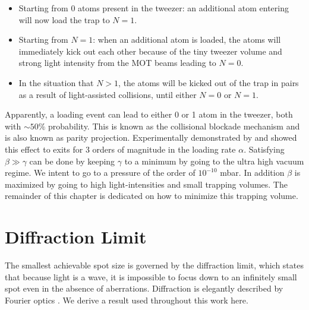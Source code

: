 \begin{itemize}
	\item Starting from 0 atoms present in the tweezer: an additional atom entering will now load the trap to $N=1$. 
	
	\item Starting from $N=1$: when an additional atom is loaded, the atoms will immediately kick out each other because of the tiny tweezer volume and strong light intensity from the MOT beams leading to $N=0$.
	
	\item In the situation that $N>1$, the atoms will be kicked out of the trap in pairs as a result of light-assisted collisions, until either $N=0$ or $N=1$.
\end{itemize}
Apparently, a loading event can lead to either 0 or 1 atom in the tweezer, both with $\sim 50\%$ probability. 
This is known as the collisional blockade mechanism and is also known as parity projection.
Experimentally demonstrated by \cite{Schlosser2001} and \cite{Schlosser2002} showed this effect to exits for 3 orders of magnitude in the loading rate $\alpha$.
Satisfying $\beta \gg \gamma$ can be done by keeping $\gamma$ to a minimum by going to the ultra high vacuum regime.
We intent to go to a pressure of the order of $10^{-10}$ mbar. In addition $\beta$ is maximized by going to high light-intensities and small trapping volumes. 
The remainder of this chapter is dedicated on how to minimize this trapping volume.

\section{Diffraction Limit}\label{sec:DiffractionLimit}

The smallest achievable spot size is governed by the diffraction limit, which states that because light is a wave, it is impossible to focus down to an infinitely small spot even in the absence of aberrations.
Diffraction is elegantly described by Fourier optics \cite{Goodman2005}. 
We derive a result used throughout this work here.

